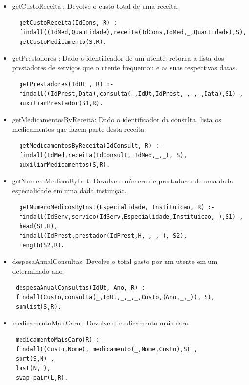 \documentclass[25pt]{article}
\begin{document}
\begin{itemize}
  \item getCustoReceita : Devolve o custo total de uma receita.
  \begin{lstlisting}
  getCustoReceita(IdCons, R) :-
  findall((IdMed,Quantidade),receita(IdCons,IdMed,_,Quantidade),S),
  getCustoMedicamento(S,R).
  \end{lstlisting}

  \item getPrestadores : Dado o identificador de um utente, retorna a lista dos prestadores de serviços que o utente frequentou e as suas respectivas datas.
  \begin{lstlisting}
  getPrestadores(IdUt , R) :-
  findall((IdPrest,Data),consulta(_,IdUt,IdPrest,_,_,_,Data),S1) ,
  auxiliarPrestador(S1,R).
  \end{lstlisting}

  \item getMedicamentosByReceita: Dado o identificador da consulta, lista os medicamentos que fazem parte desta receita.
  \begin{lstlisting}
  getMedicamentosByReceita(IdConsult, R) :-
  findall(IdMed,receita(IdConsult, IdMed,_,_), S),
  auxiliarMedicamentos(S,R).
  \end{lstlisting}

  \item getNumeroMedicosByInst: Devolve o número de prestadores de uma dada especialidade em uma dada instiuição.
  \begin{lstlisting}
  getNumeroMedicosByInst(Especialidade, Instituicao, R) :-
  findall(IdServ,servico(IdServ,Especialidade,Instituicao,_),S1) ,
  head(S1,H),
  findall(IdPrest,prestador(IdPrest,H,_,_,_), S2),
  length(S2,R).
  \end{lstlisting}


 \item despesaAnualConsultas: Devolve o total gasto por um utente em um determinado ano.
 \begin{lstlisting}
 despesaAnualConsultas(IdUt, Ano, R) :-
 findall(Custo,consulta(_,IdUt,_,_,_,Custo,(Ano,_,_)), S),
 sumlist(S,R).
 \end{lstlisting}

 \item medicamentoMaisCaro : Devolve o medicamento mais caro.
 \begin{lstlisting}
 medicamentoMaisCaro(R) :-
 findall((Custo,Nome), medicamento(_,Nome,Custo),S) ,
 sort(S,N) ,
 last(N,L),
 swap_pair(L,R).
\end{lstlisting}


\end{itemize}
\end{document}
